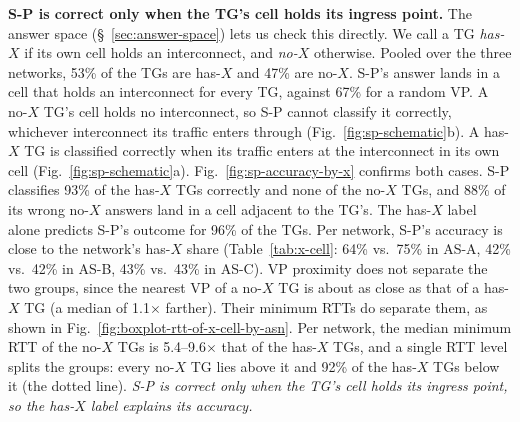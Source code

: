 \noindent \textbf{S-P is correct only when the TG's cell holds its ingress point.} The answer space (\S~\ref{sec:answer-space}) lets us check this directly. We call a TG \emph{has-$X$} if its own cell holds an interconnect, and \emph{no-$X$} otherwise. Pooled over the three networks, 53\% of the TGs are has-$X$ and 47\% are no-$X$. S-P's answer lands in a cell that holds an interconnect for every TG, against 67\% for a random VP. A no-$X$ TG's cell holds no interconnect, so S-P cannot classify it correctly, whichever interconnect its traffic enters through (Fig.~\ref{fig:sp-schematic}b). A has-$X$ TG is classified correctly when its traffic enters at the interconnect in its own cell (Fig.~\ref{fig:sp-schematic}a). Fig.~\ref{fig:sp-accuracy-by-x} confirms both cases. S-P classifies 93\% of the has-$X$ TGs correctly and none of the no-$X$ TGs, and 88\% of its wrong no-$X$ answers land in a cell adjacent to the TG's. The has-$X$ label alone predicts S-P's outcome for 96\% of the TGs. Per network, S-P's accuracy is close to the network's has-$X$ share (Table~\ref{tab:x-cell}: 64\% vs.\ 75\% in AS-A, 42\% vs.\ 42\% in AS-B, 43\% vs.\ 43\% in AS-C). VP proximity does not separate the two groups, since the nearest VP of a no-$X$ TG is about as close as that of a has-$X$ TG (a median of 1.1$\times$ farther). Their minimum RTTs do separate them, as shown in Fig.~\ref{fig:boxplot-rtt-of-x-cell-by-asn}. Per network, the median minimum RTT of the no-$X$ TGs is 5.4--9.6$\times$ that of the has-$X$ TGs, and a single RTT level splits the groups: every no-$X$ TG lies above it and 92\% of the has-$X$ TGs below it (the dotted line). \emph{S-P is correct only when the TG's cell holds its ingress point, so the has-$X$ label explains its accuracy.}

